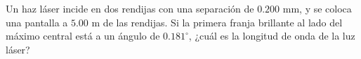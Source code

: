 \item Un haz láser incide en dos rendijas con una separación de $0.200\text{ mm}$, y se coloca una pantalla a $5.00\text{ m}$ de las rendijas. Si la primera franja brillante al lado del máximo central está a un ángulo de $0.181^\circ$, ¿cuál es la longitud de onda de la luz láser?